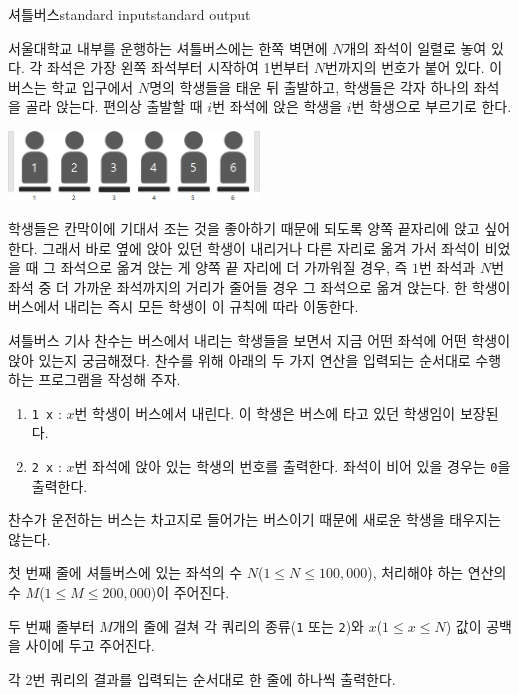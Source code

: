 \begin{problem}{셔틀버스}{standard input}{standard output}

서울대학교 내부를 운행하는 셔틀버스에는 한쪽 벽면에 $N$개의 좌석이 일렬로 놓여 있다. 각 좌석은 가장 왼쪽 좌석부터 시작하여 1번부터 $N$번까지의 번호가 붙어 있다. 이 버스는 학교 입구에서 $N$명의 학생들을 태운 뒤 출발하고, 학생들은 각자 하나의 좌석을 골라 앉는다. 편의상 출발할 때 $i$번 좌석에 앉은 학생을 $i$번 학생으로 부르기로 한다.

\begin{center}
  \includegraphics[width=0.5\textwidth]{bus1.png}
\end{center}
학생들은 칸막이에 기대서 조는 것을 좋아하기 때문에 되도록 양쪽 끝자리에 앉고 싶어 한다. 그래서 바로 옆에 앉아 있던 학생이 내리거나 다른 자리로 옮겨 가서 좌석이 비었을 때 그 좌석으로 옮겨 앉는 게 양쪽 끝 자리에 더 가까워질 경우, 즉 $1$번 좌석과 $N$번 좌석 중 더 가까운 좌석까지의 거리가 줄어들 경우 그 좌석으로 옮겨 앉는다. 한 학생이 버스에서 내리는 즉시 모든 학생이 이 규칙에 따라 이동한다.

셔틀버스 기사 찬수는 버스에서 내리는 학생들을 보면서 지금 어떤 좌석에 어떤 학생이 앉아 있는지 궁금해졌다. 찬수를 위해 아래의 두 가지 연산을 입력되는 순서대로 수행하는 프로그램을 작성해 주자.

\begin{enumerate}
\item{\texttt{1 x} : $x$번 학생이 버스에서 내린다. 이 학생은 버스에 타고 있던 학생임이 보장된다.}
\item{\texttt{2 x} : $x$번 좌석에 앉아 있는 학생의 번호를 출력한다. 좌석이 비어 있을 경우는 \texttt{0}을 출력한다.}
\end{enumerate}

찬수가 운전하는 버스는 차고지로 들어가는 버스이기 때문에 새로운 학생을 태우지는 않는다.

\InputFile
첫 번째 줄에 셔틀버스에 있는 좌석의 수 $N$($1 \le N \le 100,000$), 처리해야 하는 연산의 수 $M$($1 \le M \le 200,000$)이 주어진다.

두 번째 줄부터 $M$개의 줄에 걸쳐 각 쿼리의 종류(\texttt{1} 또는 \texttt{2})와 $x$($1 \le x \le N$) 값이 공백을 사이에 두고 주어진다.

\OutputFile
각 2번 쿼리의 결과를 입력되는 순서대로 한 줄에 하나씩 출력한다.


\end{problem}
